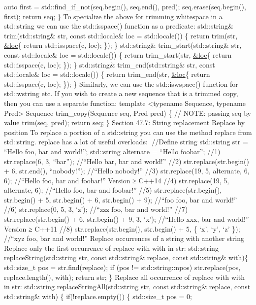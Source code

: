 auto first = std::find\_if\_not(seq.begin(), seq.end(), pred);
seq.erase(seq.begin(), first); return seq; \} To specialize the above
for trimming whitespace in a std::string we can use the std::isspace()
function as a predicate: std::string\& trim(std::string\& str, const
std::locale\& loc = std::locale()) \{ return trim(str,
\href{const\%20char\%20c}{\&loc}\{ return std::isspace(c, loc); \}); \}
std::string\& trim\_start(std::string\& str, const std::locale\& loc =
std::locale()) \{ return trim\_start(str,
\href{const\%20char\%20c}{\&loc}\{ return std::isspace(c, loc); \}); \}
std::string\& trim\_end(std::string\& str, const std::locale\& loc =
std::locale()) \{ return trim\_end(str,
\href{const\%20char\%20c}{\&loc}\{ return std::isspace(c, loc); \}); \}
Similarly, we can use the std::iswspace() function for std::wstring etc.
If you wish to create a new sequence that is a trimmed copy, then you
can use a separate function: template \textless typename Sequence,
typename Pred\textgreater{} Sequence trim\_copy(Sequence seq, Pred pred)
\{ // NOTE: passing seq by value trim(seq, pred); return seq; \} Section
47.7: String replacement Replace by position To replace a portion of a
std::string you can use the method replace from std::string. replace has
a lot of useful overloads: //Define string std::string str = ``Hello
foo, bar and world!''; std::string alternate = ``Hello foobar''; //1)
str.replace(6, 3, ``bar''); //``Hello bar, bar and world!'' //2)
str.replace(str.begin() + 6, str.end(), ``nobody!''); //``Hello
nobody!'' //3) str.replace(19, 5, alternate, 6, 6); //``Hello foo, bar
and foobar!'' Version ≥ C++14 //4) str.replace(19, 5, alternate, 6);
//``Hello foo, bar and foobar!'' //5) str.replace(str.begin(),
str.begin() + 5, str.begin() + 6, str.begin() + 9); //``foo foo, bar and
world!'' //6) str.replace(0, 5, 3, `z'); //``zzz foo, bar and world!''
//7) str.replace(str.begin() + 6, str.begin() + 9, 3, `x'); //``Hello
xxx, bar and world!'' Version ≥ C++11 //8) str.replace(str.begin(),
str.begin() + 5, \{ `x', `y', `z' \}); //``xyz foo, bar and world!''
Replace occurrences of a string with another string Replace only the
ﬁrst occurrence of replace with with in str: std::string
replaceString(std::string str, const std::string\& replace, const
std::string\& with)\{ std::size\_t pos = str.find(replace); if (pos !=
std::string::npos) str.replace(pos, replace.length(), with); return str;
\} Replace all occurrence of replace with with in str: std::string
replaceStringAll(std::string str, const std::string\& replace, const
std::string\& with) \{ if(!replace.empty()) \{ std::size\_t pos = 0;
